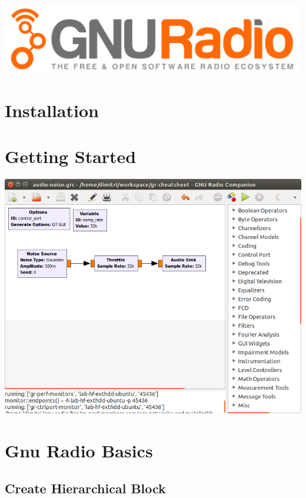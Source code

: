 \documentclass[10pt]{article}
\begin{document}
\includegraphics[width=0.95\linewidth]{gnuradio_logo_web}


\begin{multicols*}{3}
\section{Installation}




\section{Getting Started}

\includegraphics[width=0.99\linewidth]{./grc-screenshot}



\section{Gnu Radio Basics}

\subsection{Create Hierarchical Block}


\end{multicols*}
\end{document}
